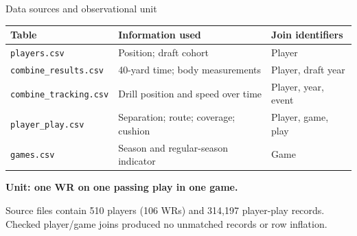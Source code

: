 \documentclass[aspectratio=169,11pt]{beamer}
\newcommand{\key}[1]{{\color{teal}\bfseries #1}}
\begin{document}
\begin{frame}{Data sources and observational unit}
\small
\begin{tabular}{@{}P{3.8cm}P{5.4cm}P{3.6cm}@{}}
\toprule
\textbf{Table} & \textbf{Information used} & \textbf{Join identifiers}\\
\midrule
\texttt{players.csv} & Position; draft cohort & Player\\
\texttt{combine\_results.csv} & 40-yard time; body measurements & Player, draft year\\
\texttt{combine\_tracking.csv} & Drill position and speed over time & Player, year, event\\
\texttt{player\_play.csv} & Separation; route; coverage; cushion & Player, game, play\\
\texttt{games.csv} & Season and regular-season indicator & Game\\
\bottomrule
\end{tabular}\par
\vspace{4mm}
\key{Unit: one WR on one passing play in one game.}\par\medskip
Source files contain 510 players (106 WRs) and 314,197 player-play records. Checked player/game joins produced no unmatched records or row inflation.
\end{frame}
\end{document}
